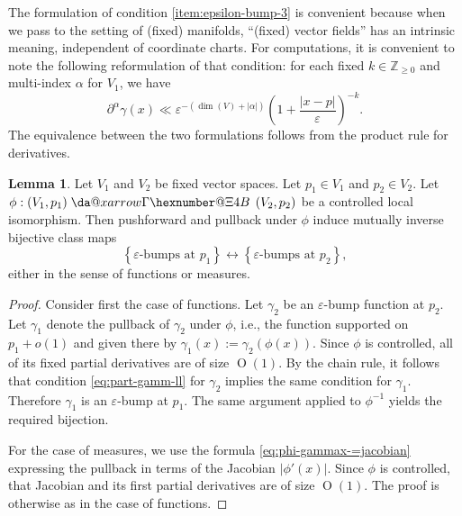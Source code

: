 \documentclass[reqno]{amsart}
\makeatletter
\newcommand*{\da@rightarrow}{\mathchar"0\hexnumber@\symAMSa 4B }
\newcommand*{\xdashrightarrow}[2][]{%
  \mathrel{%
    \mathpalette{\da@xarrow{#1}{#2}{}\da@rightarrow{\,}{}}{}%
  }%
}
\newcommand*{\da@xarrow}[7]{%
  \sbox0{$\ifx#7\scriptstyle\scriptscriptstyle\else\scriptstyle\fi#5#1#6\m@th$}%
  \sbox2{$\ifx#7\scriptstyle\scriptscriptstyle\else\scriptstyle\fi#5#2#6\m@th$}%
  \sbox4{$#7\dabar@\m@th$}%
  \dimen@=\wd0 %
  \ifdim\wd2 >\dimen@
    \dimen@=\wd2 %
  \fi
  \count@=2 %
  \def\da@bars{\dabar@\dabar@}%
  \@whiledim\count@\wd4<\dimen@\do{%
    \advance\count@\@ne
    \expandafter\def\expandafter\da@bars\expandafter{%
      \da@bars
      \dabar@ 
    }%
  }%
  \mathrel{#3}%
  \mathrel{%
    \mathop{\da@bars}\limits
    \ifx\\#1\\%
    \else
      _{\copy0}%
    \fi
    \ifx\\#2\\%
    \else
      ^{\copy2}%
    \fi
  }%
  \mathrel{#4}%
}
\def\eps{\varepsilon}
\def\O{\operatorname{O}}
\theoremstyle{plain} \newtheorem{theorem} {Theorem}
\theoremstyle{definition} \newtheorem{definition} [theorem] {Definition}
\theoremstyle{itplain} %
\newtheorem{lemma}[theorem]{Lemma}
\numberwithin{equation}{section}
\numberwithin{theorem}{section}
\renewcommand{\geq}{\geqslant}
\makeatother
\begin{document}
\begin{remark}
The formulation of condition \eqref{item:epsilon-bump-3} is convenient because when we pass to the setting of (fixed) manifolds, ``(fixed) vector fields'' has an intrinsic meaning, independent of coordinate charts.  For computations, it is convenient to note the following reformulation of that condition: for each fixed $k \in \mathbb{Z}_{\geq 0}$ and multi-index $\alpha$ for $V_1$, we have
\begin{equation}\label{eq:part-gamm-ll}
  \partial^\alpha \gamma(x) \ll \eps^{ -(\dim (V) + |\alpha|)}  \left( 1 + \frac{|x-p|}{\eps} \right)^{-k}.
\end{equation}
The equivalence between the two formulations follows from the product rule for derivatives.
\end{remark}

\begin{lemma}\label{lem:let-v_1-v_2}
  Let $V_1$ and $V_2$ be fixed vector spaces.  Let $p_1 \in V_1$ and $p_2 \in V_2$.  Let $\phi : (V_1,p_1) \xdashrightarrow{} (V_2,p_2)$ be a controlled local isomorphism.  Then pushforward and pullback under $\phi$ induce mutually inverse bijective class maps
  \begin{equation}\label{eq:lefttexteps-bumps-at}
    \left\{\text{$\eps$-bumps at $p_1$} \right\}
    \leftrightarrow 
    \left\{\text{$\eps$-bumps at $p_2$} \right\},
  \end{equation}
  either in the sense of functions or measures.
\end{lemma}
\begin{proof}
  Consider first the case of functions.  Let $\gamma_2$ be an $\eps$-bump function at $p_2$.  Let $\gamma_1$ denote the pullback of $\gamma_2$ under $\phi$, i.e., the function supported on $p_1 + o(1)$ and given there by $\gamma_1(x) := \gamma_2(\phi(x))$.  Since $\phi$ is controlled, all of its fixed partial derivatives are of size $\O(1)$.  By the chain rule, it follows that condition \eqref{eq:part-gamm-ll} for $\gamma_2$ implies the same condition for $\gamma_1$.  Therefore $\gamma_1$ is an $\eps$-bump at $p_1$.  The same argument applied to $\phi^{-1}$ yields the required bijection.

  For the case of measures, we use the formula \eqref{eq:phi-gammax-=jacobian} expressing the pullback in terms of the Jacobian $|\phi '(x)|$.  Since $\phi$ is controlled, that Jacobian and its first partial derivatives are of size $\O(1)$.  The proof is otherwise as in the case of functions.
\end{proof}
\end{document}
